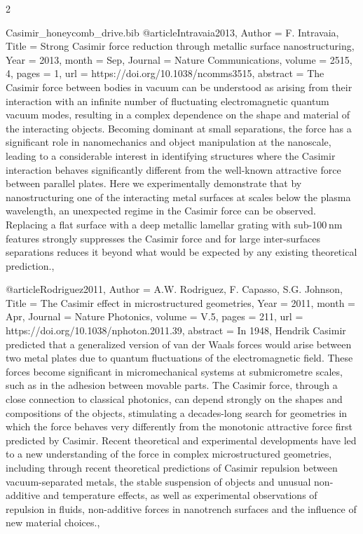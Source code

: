 \documentclass[twoside, 10pt]{article}
\def\myfilename{Casimir_honeycomb_drive}
\begin{document}
\begin{multicols}{2}
\begin{filecontents}{\myfilename.bib}
@article{Intravaia2013,
    Author = {F. Intravaia},
    Title = {Strong Casimir force reduction through metallic surface nanostructuring},
    Year = {2013},
    month = {Sep},
    Journal = {Nature Communications},
    volume = {2515, 4},
    pages = {1},
    url = {https://doi.org/10.1038/ncomms3515},
    abstract = {The Casimir force between bodies in vacuum can be understood as arising from their interaction with an infinite number of fluctuating electromagnetic quantum vacuum modes, resulting in a complex dependence on the shape and material of the interacting objects. Becoming dominant at small separations, the force has a significant role in nanomechanics and object manipulation at the nanoscale, leading to a considerable interest in identifying structures where the Casimir interaction behaves significantly different from the well-known attractive force between parallel plates. Here we experimentally demonstrate that by nanostructuring one of the interacting metal surfaces at scales below the plasma wavelength, an unexpected regime in the Casimir force can be observed. Replacing a flat surface with a deep metallic lamellar grating with sub-100 nm features strongly suppresses the Casimir force and for large inter-surfaces separations reduces it beyond what would be expected by any existing theoretical prediction.},
}



@article{Rodriguez2011,
    Author = {A.W. Rodriguez, F. Capasso, S.G. Johnson},
    Title = {The Casimir effect in microstructured geometries},
    Year = {2011},
    month = {Apr},
    Journal = {Nature Photonics},
    volume = {V.5},
    pages = {211},
    url = {https://doi.org/10.1038/nphoton.2011.39},
    abstract = {In 1948, Hendrik Casimir predicted that a generalized version of van der Waals forces would arise between two metal plates due to quantum fluctuations of the electromagnetic field. These forces become significant in micromechanical systems at submicrometre scales, such as in the adhesion between movable parts. The Casimir force, through a close connection to classical photonics, can depend strongly on the shapes and compositions of the objects, stimulating a decades-long search for geometries in which the force behaves very differently from the monotonic attractive force first predicted by Casimir. Recent theoretical and experimental developments have led to a new understanding of the force in complex microstructured geometries, including through recent theoretical predictions of Casimir repulsion between vacuum-separated metals, the stable suspension of objects and unusual non-additive and temperature effects, as well as experimental observations of repulsion in fluids, non-additive forces in nanotrench surfaces and the influence of new material choices.},
}


\end{filecontents}
\end{multicols}
\end{document}
